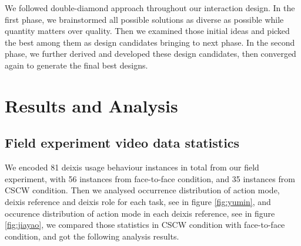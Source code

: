 \documentclass[12pt,twoside]{article}
\begin{document}
We followed double-diamond approach throughout our interaction design. In the first phase, we brainstormed all possible solutions as diverse as possible while quantity matters over quality. Then we examined those initial ideas and picked the best among them as design candidates bringing to next phase. In the second phase, we further derived and developed these design candidates, then converged again to generate the final best designs.

\section{Results and Analysis}
\label{sec:results}
\subsection{Field experiment video data statistics}
\label{sec:statistics}
We encoded 81 deixis usage behaviour instances in total from our field experiment, with 56 instances from face-to-face condition, and 35 instances from CSCW condition. Then we analysed occurrence distribution of action mode, deixis reference and deixis role for each task, see in figure \ref{fig:yumin}, and occurence distribution of action mode in each deixis reference, see in figure \ref{fig:jiayao}, we compared those statistics in CSCW condition with face-to-face condition, and got the following analysis results.
\end{document}
